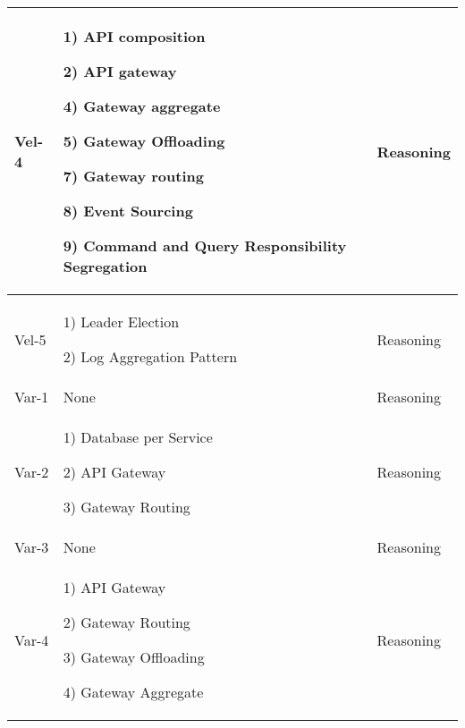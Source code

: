 \documentclass[conference]{IEEEtran}
\begin{document}
\begin{center}
\begin{table*}
\begin{tabular}{ | m{2cm} | m{8cm} |  m{2cm} |}
        Vel-4 &  

        1) API composition
        
        2) API gateway

        4) Gateway aggregate

        5) Gateway Offloading
        
        7) Gateway routing 
        
        8) Event Sourcing

        9) Command and Query Responsibility Segregation

        & Reasoning
        
        \\
        \hline

        Vel-5 &  

        1) Leader Election 

        2) Log Aggregation Pattern 

        & Reasoning
        
        \\
        \hline

        
        Var-1 &  
        
        None

        & Reasoning
        
        \\
        \hline

        Var-2 &  
        
        1)  Database per Service

        2) API Gateway

        3) Gateway Routing

        & Reasoning
        
        \\
        \hline

        Var-3 & None  & Reasoning
        
        \\
        \hline

        Var-4 &  

        1) API Gateway

        2) Gateway Routing

        3) Gateway Offloading

        4) Gateway Aggregate
        
        & Reasoning
        
        \\
        \hline
  
    \end{tabular}
    \end{table*}
\end{center}
\end{document}
